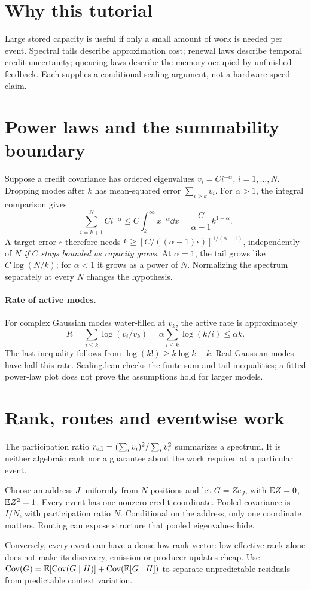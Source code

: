 \documentclass[11pt]{article}
\begin{document}
\section*{Why this tutorial}
Large stored capacity is useful if only a small amount of work is needed per event. Spectral tails describe approximation cost; renewal laws describe temporal credit uncertainty; queueing laws describe the memory occupied by unfinished feedback. Each supplies a conditional scaling argument, not a hardware speed claim.
\section{Power laws and the summability boundary}
Suppose a credit covariance has ordered eigenvalues $v_i=Ci^{-\alpha}$, $i=1,\dots,N$. Dropping modes after $k$ has mean-squared error $\sum_{i>k}v_i$. For $\alpha>1$, the integral comparison gives
\[
 \sum_{i=k+1}^{N}Ci^{-\alpha}
 \le C\int_k^\infty x^{-\alpha}\dd x
 =\frac{C}{\alpha-1}k^{1-\alpha}.
\]
A target error $\epsilon$ therefore needs $k\ge[C/((\alpha-1)\epsilon)]^{1/(\alpha-1)}$, independently of $N$ \emph{if $C$ stays bounded as capacity grows}. At $\alpha=1$, the tail grows like $C\log(N/k)$; for $\alpha<1$ it grows as a power of $N$. Normalizing the spectrum separately at every $N$ changes the hypothesis.
\paragraph{Rate of active modes.} For complex Gaussian modes water-filled at $v_k$, the active rate is approximately
\[
 R=\sum_{i\le k}\log(v_i/v_k)
 =\alpha\sum_{i\le k}\log(k/i)\le\alpha k.
\]
The last inequality follows from $\log(k!)\ge k\log k-k$. Real Gaussian modes have half this rate. Scaling.lean checks the finite sum and tail inequalities; a fitted power-law plot does not prove the assumptions hold for larger models.
\section{Rank, routes and eventwise work}
The participation ratio $r_{\rm eff}=(\sum_iv_i)^2/\sum_iv_i^2$ summarizes a spectrum. It is neither algebraic rank nor a guarantee about the work required at a particular event.
\begin{example}
Choose an address $J$ uniformly from $N$ positions and let $G=Ze_J$, with $\mathbb{E} Z=0$, $\mathbb{E} Z^2=1$. Every event has one nonzero credit coordinate. Pooled covariance is $I/N$, with participation ratio $N$. Conditional on the address, only one coordinate matters. Routing can expose structure that pooled eigenvalues hide.
\end{example}
Conversely, every event can have a dense low-rank vector: low effective rank alone does not make its discovery, emission or producer updates cheap. Use $\operatorname{Cov}(G)=\mathbb{E}[\operatorname{Cov}(G\mid H)]+\operatorname{Cov}(\mathbb{E}[G\mid H])$ to separate unpredictable residuals from predictable context variation.
\end{document}
